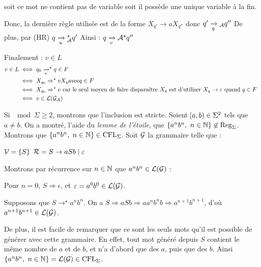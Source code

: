 \begin{nproof}
\begin{enumerate}
            \begin{enumerate}
                \itt soit ce mot ne contient pas de variable
                \itt soit il possède une unique variable à la fin.
            \end{enumerate}
            Donc, la dernière règle utilisée est de la forme $X_{q'} \to aX_{q''}$ donc $q' \lima{q}{}_\bcA q'' $
            De plus, par (HR) $q \lima{u}{}_\bcA^\star q'$ Ainsi : $q \lima{v}{}\bcA^\star q''$
        \end{enumerate}
        Finalement :
        $v \in L$
        \begin{align*}
            v \in L &\iff q_0 \lima{v}^\star q \in F\\
            &\iff X_{q_0} \Rightarrow^\star v X_q \text{avec} q \in F\\
            &\iff X_{q_0} \Rightarrow^\star v \ \text{car le seul moyen de faire disparaître} \ X_q \ \text{est d'utiliser} \ X_q \to \epsilon \ \text{quand} \ q \in F\\
            &\iff v \in \bcL\p{\bcG_\bcA}
        \end{align*}
        
        Si $\mod{\Sigma} \geq 2$, montrons que l'inclusion est stricte. Soient $\!\left(a, b\right) \in \Sigma^2$ tels que $a \neq b$. On a montré, l'aide du \emph{lemme de l'étoile}, que $\left\{a^nb^n,\ n \in \mathbb{N}\right\} \not\in \operatorname{Reg}_\Sigma$. Montrons que $\ens{a^nb^n,\ n \in \bdN} \in \CFL_\Sigma$. Soit $\mathcal{G}$ la grammaire telle que :
        \begin{enumerate}
            \itt $\mathcal{V} = \left\{S\right\}$
            \itt $\mathcal{R} = S \rightarrow aSb \mid \varepsilon$
        \end{enumerate}
        Montrons par récurrence sur $n \in \mathbb{N}$ que $a^nb^n \in \mathcal{L}\!\left(\mathcal{G}\right)$ :
        \begin{enumerate}
            \itt Pour $n = 0$, $S \Rightarrow \epsilon$, et $\varepsilon = a^0b^0 \in \mathcal{L}\!\left(\mathcal{G}\right)$.
            
            \itt Supposons que $S \rightarrow^\star a^nb^n$. On a $S \Rightarrow aSb \Rightarrow aa^nb^nb \Rightarrow a^{n+1}b^{n+1}$, d'où $a^{n+1}b^{n+1} \in \mathcal{L}\!\left(\mathcal{G}\right)$.
        \end{enumerate}
        De plus, il est facile de remarquer que ce sont les seuls mots qu'il est possible de générer avec cette grammaire. En effet, tout mot généré depuis $S$ contient le même nombre de $a$ et de $b$, et n'a d'abord que des $a$, puis que des $b$. Ainsi $\ens{a^nb^n,\ n \in \bdN} = \bcL\p{\bcG} \in \CFL_\Sigma$.
    \end{nproof}
    
